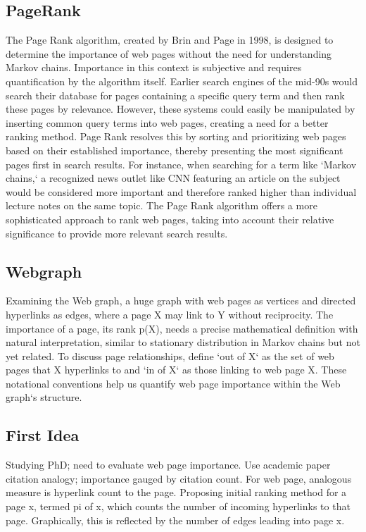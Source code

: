 \subsection*{PageRank}
The Page Rank algorithm, created by Brin and Page in 1998, is designed to determine the importance of web pages without the need for understanding Markov chains.
Importance in this context is subjective and requires quantification by the algorithm itself.
Earlier search engines of the mid-90s would search their database for pages containing a specific query term and then rank these pages by relevance.
However, these systems could easily be manipulated by inserting common query terms into web pages, creating a need for a better ranking method.
Page Rank resolves this by sorting and prioritizing web pages based on their established importance, thereby presenting the most significant pages first in search results.
For instance, when searching for a term like `Markov chains,` a recognized news outlet like CNN featuring an article on the subject would be considered more important and therefore ranked higher than individual lecture notes on the same topic.
The Page Rank algorithm offers a more sophisticated approach to rank web pages, taking into account their relative significance to provide more relevant search results.

\subsection*{Webgraph}
Examining the Web graph, a huge graph with web pages as vertices and directed hyperlinks as edges, where a page X may link to Y without reciprocity.
The importance of a page, its rank p(X), needs a precise mathematical definition with natural interpretation, similar to stationary distribution in Markov chains but not yet related.
To discuss page relationships, define `out of X` as the set of web pages that X hyperlinks to and `in of X` as those linking to web page X\@.
These notational conventions help us quantify web page importance within the Web graph`s structure.

\subsection*{First Idea}
Studying PhD; need to evaluate web page importance.
Use academic paper citation analogy; importance gauged by citation count.
For web page, analogous measure is hyperlink count to the page.
Proposing initial ranking method for a page x, termed pi of x, which counts the number of incoming hyperlinks to that page.
Graphically, this is reflected by the number of edges leading into page x.

